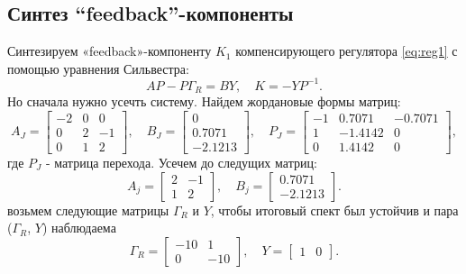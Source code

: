 \subsection{Синтез ``feedback''-компоненты}

Синтезируем «feedback»-компоненту $K_1$ компенсирующего регулятора \eqref{eq:reg1}
с помощью уравнения Сильвестра:
\begin{equation*}
    AP-P\Gamma_R=BY,\quad K=-YP^{-1}.
\end{equation*}
Но сначала нужно усечть систему. Найдем жордановые формы матриц:
\begin{equation*}
    A_J=\begin{bmatrix}
        -2&     0&     0\\
        0&     2&    -1\\
        0&     1&     2   
    \end{bmatrix},\quad
    B_J=\begin{bmatrix}
        0\\
        0.7071\\
       -2.1213
    \end{bmatrix},\quad
    P_J = \begin{bmatrix}
        -1&    0.7071&   -0.7071\\
        1&   -1.4142&         0\\
             0    &1.4142&         0
    \end{bmatrix},
\end{equation*}
где $P_J$ - матрица перехода. Усечем до следущих матриц:
\begin{equation*}
    A_j=\begin{bmatrix}
        2&    -1\\
        1&     2   
    \end{bmatrix},\quad
    B_j=\begin{bmatrix}
        0.7071\\
       -2.1213
    \end{bmatrix}.
\end{equation*}
возьмем следующие матрицы $\Gamma_R$ и $Y$, чтобы итоговый спект был устойчив и
пара ($\Gamma_R$, $Y$) наблюдаема
\begin{equation*}
    \Gamma_R=\begin{bmatrix}
        -10 & 1\\0&-10
    \end{bmatrix},\quad
    Y=\begin{bmatrix}
        1 & 0
    \end{bmatrix}.
\end{equation*}
